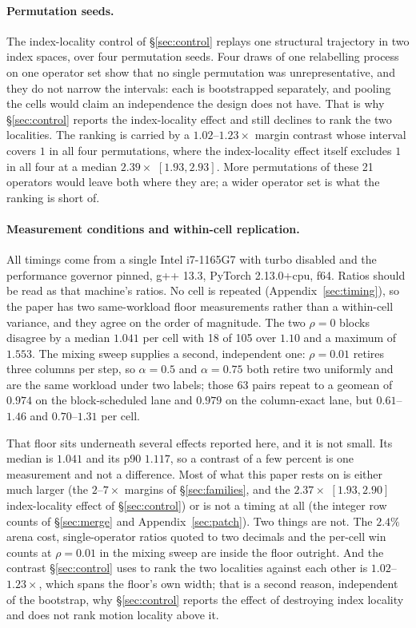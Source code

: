 \documentclass{article}
\begin{document}
\paragraph{Permutation seeds.} The index-locality control of \S\ref{sec:control}
replays one structural trajectory in two index spaces, over four permutation
seeds. Four draws of one relabelling process on one operator set show that no
single permutation was unrepresentative, and they do not narrow the intervals:
each is bootstrapped separately, and pooling the cells would claim an
independence the design does not have. That is why \S\ref{sec:control} reports
the index-locality effect and still declines to rank the two localities. The
ranking is carried by a $1.02$--$1.23\times$ margin contrast whose interval
covers $1$ in all four permutations, where the index-locality effect itself
excludes $1$ in all four at a median $2.39\times$ $[1.93, 2.93]$. More
permutations of these 21 operators would leave both where they are; a wider
operator set is what the ranking is short of.

\paragraph{Measurement conditions and within-cell replication.} All timings come
from a single Intel i7-1165G7 with turbo disabled and the performance governor
pinned, g++ 13.3, PyTorch 2.13.0+cpu, f64. Ratios should be read as that
machine's ratios. No cell is repeated (Appendix~\ref{sec:timing}), so the paper has two
same-workload floor measurements rather than a within-cell variance, and they
agree on the order of magnitude. The two $\rho{=}0$ blocks disagree by a median
$1.041$ per cell with 18 of 105 over $1.10$ and a maximum of $1.553$. The mixing
sweep supplies a second, independent one: $\rho{=}0.01$ retires three columns per
step, so $\alpha{=}0.5$ and $\alpha{=}0.75$ both retire two uniformly and are the
same workload under two labels; those 63 pairs repeat to a geomean of $0.974$ on
the block-scheduled lane and $0.979$ on the column-exact lane, but $0.61$--$1.46$
and $0.70$--$1.31$ per cell.

That floor sits underneath several effects reported here, and it is not small.
Its median is $1.041$ and its p90 $1.117$, so a contrast of a few percent is one
measurement and not a difference. Most of what this paper rests on is either
much larger (the $2$--$7\times$ margins of \S\ref{sec:families}, and the
$2.37\times$ $[1.93, 2.90]$ index-locality effect of \S\ref{sec:control}) or is
not a timing at all (the integer row counts of \S\ref{sec:merge} and
Appendix~\ref{sec:patch}). Two things are not. The $2.4\%$ arena cost,
single-operator ratios quoted to two decimals and the per-cell win counts at
$\rho{=}0.01$ in the mixing sweep are inside the floor outright. And the
contrast \S\ref{sec:control} uses to rank the two localities against each other
is $1.02$--$1.23\times$, which spans the floor's own width; that is a second reason,
independent of the bootstrap, why \S\ref{sec:control} reports the effect of
destroying index locality and does not rank motion locality above it.
\end{document}
